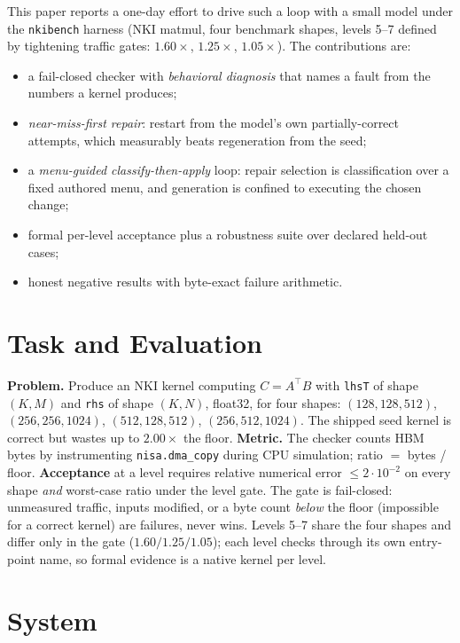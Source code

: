 \documentclass[10pt]{article}
\begin{document}
This paper reports a one-day effort to drive such a loop with a small model under the
\texttt{nkibench} harness (NKI matmul, four benchmark shapes, levels 5--7 defined by tightening
traffic gates: $1.60\times$, $1.25\times$, $1.05\times$). The contributions are:
\begin{itemize}[leftmargin=1.4em,itemsep=1pt,topsep=2pt]
  \item a fail-closed checker with \emph{behavioral diagnosis} that names a fault from the numbers
        a kernel produces;
  \item \emph{near-miss-first repair}: restart from the model's own partially-correct attempts,
        which measurably beats regeneration from the seed;
  \item a \emph{menu-guided classify-then-apply} loop: repair selection is classification over a
        fixed authored menu, and generation is confined to executing the chosen change;
  \item formal per-level acceptance plus a robustness suite over declared held-out cases;
  \item honest negative results with byte-exact failure arithmetic.
\end{itemize}

\section{Task and Evaluation}
\textbf{Problem.} Produce an NKI kernel computing $C = A^{\top}B$ with \texttt{lhsT} of shape
$(K,M)$ and \texttt{rhs} of shape $(K,N)$, float32, for four shapes: $(128,128,512)$,
$(256,256,1024)$, $(512,128,512)$, $(256,512,1024)$. The shipped seed kernel is correct but wastes
up to $2.00\times$ the floor. \textbf{Metric.} The checker counts HBM bytes by instrumenting
\texttt{nisa.dma\_copy} during CPU simulation; ratio $=$ bytes / floor. \textbf{Acceptance} at a
level requires relative numerical error $\leq 2\cdot10^{-2}$ on every shape \emph{and} worst-case
ratio under the level gate. The gate is fail-closed: unmeasured traffic, inputs modified, or a
byte count \emph{below} the floor (impossible for a correct kernel) are failures, never wins.
Levels 5--7 share the four shapes and differ only in the gate ($1.60/1.25/1.05$); each level
checks through its own entry-point name, so formal evidence is a native kernel per level.

\section{System}
\end{document}
